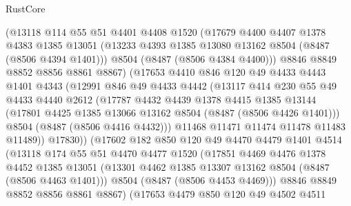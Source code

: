 \begin{lexlean}{RustCore}
\begin{coremodule}
              (@13118
                @114
                @55
                @51
                @4401
                @4408
                @1520
                (@17679
                  @4400
                  @4407
                  @1378
                  @4383
                  @1385
                  @13051
                  (@13233 @4393 @1385 @13080 @13162 @8504 (@8487 (@8506 @4394 @1401)))
                  @8504
                  (@8487 (@8506 @4384 @4400)))
                @8846
                @8849
                @8852
                @8856
                @8861
                @8867)
              (@17653
                @4410
                @846
                @120
                @49
                @4433
                @4443
                @1401
                @4343
                (@12991
                  @846
                  @49
                  @4433
                  @4442
                  (@13117
                    @414
                    @230
                    @55
                    @49
                    @4433
                    @4440
                    @2612
                    (@17787
                      @4432
                      @4439
                      @1378
                      @4415
                      @1385
                      @13144
                      (@17801 @4425 @1385 @13066 @13162 @8504 (@8487 (@8506 @4426 @1401)))
                      @8504
                      (@8487 (@8506 @4416 @4432)))
                    @11468
                    @11471
                    @11474
                    @11478
                    @11483
                    @11489))
                @17830))
            (@17602
              @182
              @850
              @120
              @49
              @4470
              @4479
              @1401
              @4514
              (@13118
                @174
                @55
                @51
                @4470
                @4477
                @1520
                (@17851
                  @4469
                  @4476
                  @1378
                  @4452
                  @1385
                  @13051
                  (@13301 @4462 @1385 @13307 @13162 @8504 (@8487 (@8506 @4463 @1401)))
                  @8504
                  (@8487 (@8506 @4453 @4469)))
                @8846
                @8849
                @8852
                @8856
                @8861
                @8867)
              (@17653
                @4479
                @850
                @120
                @49
                @4502
                @4511

\end{coremodule}
\end{lexlean}
